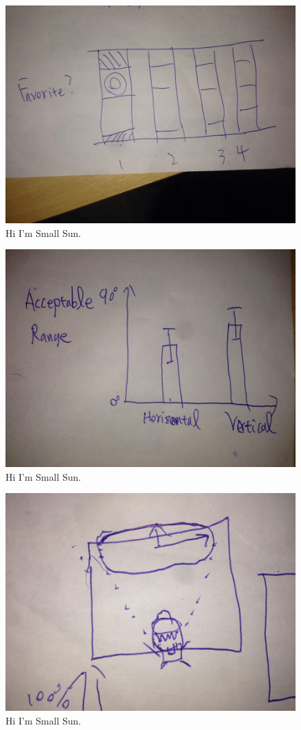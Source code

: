 \begin{figure}[!t]
\centering
\includegraphics[width=0.9\columnwidth]{Figures/US2_favoriteFire.jpg}
\caption{Hi I'm Small Sun.}
\label{fig:PS_Frus}
\end{figure}

\begin{figure}[!t]
\centering
\includegraphics[width=0.9\columnwidth]{Figures/US2_acceptableRange.jpg}
\caption{Hi I'm Small Sun.}
\label{fig:PS_Frus}
\end{figure}

\begin{figure}[!t]
\centering
\includegraphics[width=0.9\columnwidth]{Figures/coverPhoto2.jpg}
\caption{Hi I'm Small Sun.}
\label{fig:PS_Frus}
\end{figure}


